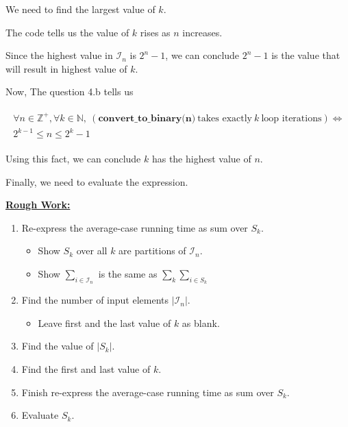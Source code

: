 \documentclass[12pt]{article}
\begin{document}
\begin{enumerate}[a.]
    We need to find the largest value of $k$.

    \bigskip

    The code tells us the value of $k$ rises as $n$ increases.

    \bigskip

    Since the highest value in $\mathcal{I}_n$ is $2^n - 1$, we can conclude
    $2^n - 1$ is the value that will result in highest value of $k$.

    \bigskip

    Now, The question 4.b tells us

    \begin{align}
        \begin{split}
        \forall n \in \mathbb{Z}^+, \forall k \in \mathbb{N},\: (\textbf{
        convert\_to\_binary(n)}\:\text{takes exactly}\:k\:\text{loop iterations}) \Leftrightarrow
        \\ 2^{k-1} \leq n \leq 2^k -1
        \end{split}
    \end{align}

    \bigskip

    Using this fact, we can conclude $k$ has the highest value of $n$.

    \bigskip

    Finally, we need to evaluate the expression.

    \bigskip

    \begin{mdframed}

    \underline{\textbf{Rough Work:}}

    \bigskip

    \begin{enumerate}[1.]
        \item Re-express the average-case running time as sum over $S_k$.
        \begin{itemize}
            \item Show $S_k$ over all $k$ are partitions of $\mathcal{I}_n$.
            \item Show $\sum\limits_{i \in \mathcal{I}_n}$ is the same as $\sum\limits_{k} \sum\limits_{i \in S_k}$
        \end{itemize}
        \item Find the number of input elements $\lvert \mathcal{I}_n \rvert$.
        \begin{itemize}
            \item Leave first and the last value of $k$ as blank.
        \end{itemize}
        \item Find the value of $\lvert S_k \rvert$.
        \item Find the first and last value of $k$.
        \item Finish re-express the average-case running time as sum over $S_k$.
        \item Evaluate $S_k$.


\end{enumerate}
\end{mdframed}
\end{enumerate}
\end{document}
